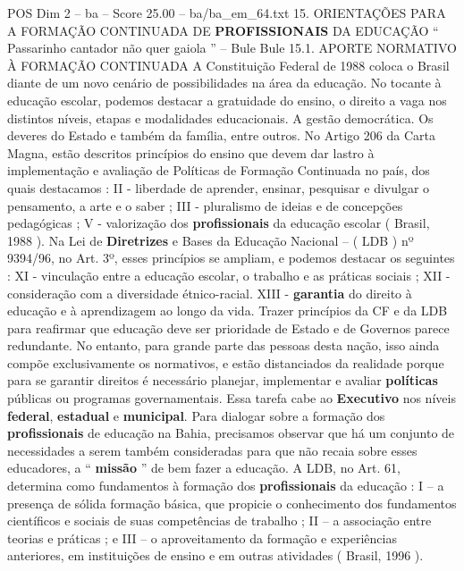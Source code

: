 \begin{textsample}{POS Dim 2 – ba – Score 25.00 – ba/ba\_em\_64.txt}  \label{ex:f2_pos_038}
15.
ORIENTAÇÕES PARA A FORMAÇÃO CONTINUADA DE \textbf{PROFISSIONAIS} DA EDUCAÇÃO “ Passarinho cantador não quer gaiola ” – Bule Bule 15.1.
APORTE NORMATIVO À FORMAÇÃO CONTINUADA A Constituição Federal de 1988 coloca o Brasil diante de um novo cenário de possibilidades na área da educação.
No tocante à educação escolar, podemos destacar a gratuidade do ensino, o direito a vaga nos distintos níveis, etapas e modalidades educacionais.
A gestão democrática.
Os deveres do Estado e também da família, entre outros.
No Artigo 206 da Carta Magna, estão descritos princípios do ensino que devem dar lastro à implementação e avaliação de Políticas de Formação Continuada no país, dos quais destacamos : II - liberdade de aprender, ensinar, pesquisar e divulgar o pensamento, a arte e o saber ; III - pluralismo de ideias e de concepções pedagógicas ; V - valorização dos \textbf{profissionais} da educação escolar ( Brasil, 1988 ).
Na Lei de \textbf{Diretrizes} e Bases da Educação Nacional – ( LDB ) nº 9394/96, no Art. 3º, esses princípios se ampliam, e podemos destacar os seguintes : XI - vinculação entre a educação escolar, o trabalho e as práticas sociais ; XII - consideração com a diversidade étnico-racial.
XIII - \textbf{garantia} do direito à educação e à aprendizagem ao longo da vida.
Trazer princípios da CF e da LDB para reafirmar que educação deve ser prioridade de Estado e de Governos parece redundante.
No entanto, para grande parte das pessoas desta nação, isso ainda compõe exclusivamente os normativos, e estão distanciados da realidade porque para se garantir direitos é necessário planejar, implementar e avaliar \textbf{políticas} públicas ou programas governamentais.
Essa tarefa cabe ao \textbf{Executivo} nos níveis \textbf{federal}, \textbf{estadual} e \textbf{municipal}.
Para dialogar sobre a formação dos \textbf{profissionais} de educação na Bahia, precisamos observar que há um conjunto de necessidades a serem também consideradas para que não recaia sobre esses educadores, a “ \textbf{missão} ” de bem fazer a educação.
A LDB, no Art. 61, determina como fundamentos à formação dos \textbf{profissionais} da educação : I – a presença de sólida formação básica, que propicie o conhecimento dos fundamentos científicos e sociais de suas competências de trabalho ; II – a associação entre teorias e práticas ; e III – o aproveitamento da formação e experiências anteriores, em instituições de ensino e em outras atividades ( Brasil, 1996 ).

\end{textsample}
